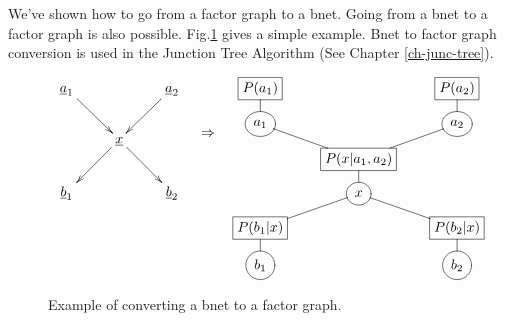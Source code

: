 We've shown
how to go from a factor graph
to a bnet.
Going from a
bnet to a factor graph
is also possible.
Fig.\ref{fig-bnet-2-fg}
gives a simple example.
Bnet  to factor
graph conversion
is used in the Junction Tree
Algorithm (See Chapter \ref{ch-junc-tree}).
\begin{figure}[h!]
$$
\begin{array}{ccc}
\xymatrix{
\rva_1\ar[dr]
&
&\rva_2\ar[dl]
\\
&\rvx\ar[dr]\ar[dl]
\\
\rvb_1
&
&\rvb_2
}
&
\xymatrix{\\
\rdart}
&
\xymatrix@R=.7pc{
*+[F]{P(a_1)}\ar@{-}[d]
&&
*+[F]{P(a_2)}\ar@{-}[d]
\\
*++[o][F]{a_1}\ar@{-}[dr]
&
&*++[o][F]{a_2}\ar@{-}[dl]
\\
&*+[F]{P(x|a_1, a_2)}\ar@{-}[d]
\\
&*++[o][F]{x}\ar@{-}[dr]\ar@{-}[dl]
\\
*+[F]{P(b_1|x)}\ar@{-}[d]
&
&*+[F]{P(b_2|x)}\ar@{-}[d]
\\
*++[o][F]{b_1}
&
&*++[o][F]{b_2}
}
\end{array}
$$
\caption{
Example
of converting a bnet
to a factor graph.}
\label{fig-bnet-2-fg}
\end{figure}






